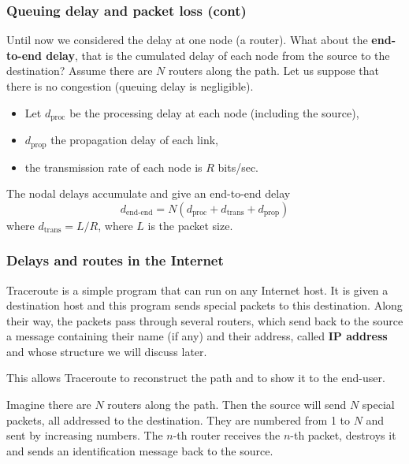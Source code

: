 %
\begin{frame}
\frametitle{Queuing delay and packet loss (cont)}

Until now we considered the delay at one node (a router). What about
the \textbf{end-to-end delay}, that is the cumulated delay of each
node from the source to the destination? Assume there are \(N\)
routers along the path. Let us suppose that there is no congestion
(queuing delay is negligible).
\begin{itemize}

  \item Let \(d_{\text{proc}}\) be the processing delay at each node
  (including the source),

  \item \(d_{\text{prop}}\) the propagation delay of each link,

  \item the transmission rate of each node is \(R\) bits/sec.

\end{itemize}
The nodal delays accumulate and give an end-to-end delay
\[d_{\text{end-end}} = N (d_{\text{proc}} + d_{\text{trans}} +
d_{\text{prop}})\]
where \(d_{\text{trans}} = L/R\), where \(L\) is the packet size.

\end{frame}

%
\begin{frame}
\frametitle{Delays and routes in the Internet}

\textsf{Traceroute} is a simple program that can run on any Internet
host. It is given a destination host and this program sends special
packets to this destination. Along their way, the packets pass through
several routers, which send back to the source a message containing
their name (if any) and their address, called \textbf{IP address} and
whose structure we will discuss later.

\bigskip

This allows \textsf{Traceroute} to reconstruct the path and to show it
to the end-user.

\bigskip

Imagine there are \(N\) routers along the path. Then the source will
send \(N\) special packets, all addressed to the destination. They are
numbered from 1 to \(N\) and sent by increasing numbers. The \(n\)-th
router receives the \(n\)-th packet, destroys it and sends an
identification message back to the source.

\end{frame}

